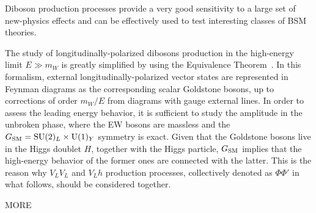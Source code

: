 Diboson production processes provide a very good sensitivity to a large set of new-physics effects and can be effectively used
to test interesting classes of BSM theories. 

The study of longitudinally-polarized dibosons production in the high-energy limit $E\gg m_{W}$ is greatly simplified
by using the Equivalence Theorem~\cite{Chanowitz:1985hj,Wulzer:2013mza}.
In this formalism, external longitudinally-polarized vector states are represented in Feynman diagrams as the corresponding
scalar Goldstone bosons, up to corrections of order $m_W/E$ from diagrams with gauge external lines.
In order to assess the leading energy behavior, it is sufficient to study the amplitude in the unbroken phase,
where the EW bosons are massless and the $G_{\rm{SM}}={\textrm{SU}}(2)_L\times{\textrm{U}}(1)_Y$ symmetry is exact.
Given that the Goldstone bosons live in the Higgs doublet $H$, together with the Higgs particle, $G_{\rm{SM}}$ implies
that the high-energy behavior of the former ones are connected with the latter. This is the reason why $V_LV_L$
and $V_Lh$ production processes, collectively denoted as $\Phi\Phi'$ in what follows, should be considered together.

{\color{red} MORE}
